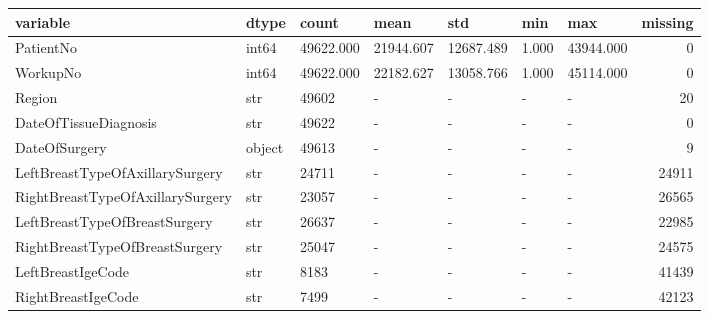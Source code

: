 \begin{tabular}{lllllllr}
\toprule
variable & dtype & count & mean & std & min & max & missing \\
\midrule
PatientNo & int64 & 49622.000 & 21944.607 & 12687.489 & 1.000 & 43944.000 & 0 \\
WorkupNo & int64 & 49622.000 & 22182.627 & 13058.766 & 1.000 & 45114.000 & 0 \\
Region & str & 49602 & - & - & - & - & 20 \\
DateOfTissueDiagnosis & str & 49622 & - & - & - & - & 0 \\
DateOfSurgery & object & 49613 & - & - & - & - & 9 \\
LeftBreastTypeOfAxillarySurgery & str & 24711 & - & - & - & - & 24911 \\
RightBreastTypeOfAxillarySurgery & str & 23057 & - & - & - & - & 26565 \\
LeftBreastTypeOfBreastSurgery & str & 26637 & - & - & - & - & 22985 \\
RightBreastTypeOfBreastSurgery & str & 25047 & - & - & - & - & 24575 \\
LeftBreastIgeCode & str & 8183 & - & - & - & - & 41439 \\
RightBreastIgeCode & str & 7499 & - & - & - & - & 42123 \\
\bottomrule
\end{tabular}
